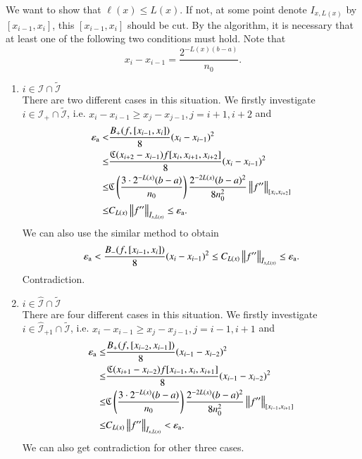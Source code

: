 We want to show that $\ell(x) \le L(x)$. If not, at some point denote $I_{x,L(x)}$ by $[x_{i-1},x_i]$, this $[x_{i-1},x_i]$ should be cut.
By the algorithm, it is necessary that at least one of the following two conditions must hold. Note that 
\[x_i-x_{i-1}=\frac{2^{-L(x)(b-a)}}{n_0}.\]
\begin{enumerate}
  \item $i \in \mathcal{I} \cap \widetilde{\mathcal{I}}$\\
  There are two different cases in this situation. We firstly investigate $i \in \mathcal{I}_+ \cap \widetilde{\mathcal{I}}$, i.e. 
  $x_{i}-x_{i-1} \ge x_{j}-x_{j-1}, j=i+1,i+2$ and
  \begin{align*}
  \abstol < & \frac{B_+(f,[x_{i-1},x_i])}{8}(x_i-x_{i-1})^2 \\
   \le &\frac{\fC(x_{i+2}-x_{i-1})f[x_{i},x_{i+1},x_{i+2}]}{8}(x_{i}-x_{i-1})^2\\
    \le & \fC\left(\frac{3\cdot2^{-L(x)}(b-a)}{n_0}\right) \frac{2^{-2L(x)}(b-a)^2}{8n^2_0}\norm[{[x_{i},x_{i+2}]}]{f''} \\
     \le & C_{L(x)} \norm[\bar{I}_{x,L(x)}]{f''} \le \abstol.
  \end{align*}
  We can also use the similar method to obtain
   \begin{align*}
  \abstol < \frac{B_-(f,[x_{i-1},x_i])}{8}(x_i-x_{i-1})^2  \le 
      C_{L(x)} \norm[\bar{I}_{x,L(x)}]{f''} \le \abstol.
  \end{align*}
  Contradiction.
  \item $i \in \widehat{\mathcal{I}}\cap \widetilde{\mathcal{I}}$\\
  There are four different cases in this situation. We firstly investigate $i \in \widehat{\mathcal{I}}_{+1} \cap \widetilde{\mathcal{I}}$, i.e.
  $x_{i}-x_{i-1} \ge x_{j}-x_{j-1}, j=i-1,i+1$ and
  \begin{align*}
  \abstol \le & \frac{B_+(f,[x_{i-2},x_{i-1}])}{8}(x_{i-1}-x_{i-2})^2 \\ \le &\frac{\fC(x_{i+1}-x_{i-2})f[x_{i-1},x_{i},x_{i+1}]}{8}(x_{i-1}-x_{i-2})^2\\
    \le & \fC\left(\frac{3\cdot2^{-L(x)}(b-a)}{n_0}\right) \frac{2^{-2L(x)}(b-a)^2}{8n^2_0}\norm[{[x_{i-1},x_{i+1}]}]{f''} \\
     \le & C_{L(x)} \norm[\bar{I}_{x,L(x)}]{f''} < \abstol.
  \end{align*}
  We can also get contradiction for other three cases.
\end{enumerate}

